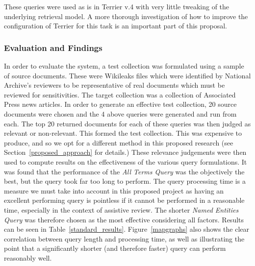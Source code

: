 \documentclass{mprop}
\begin{document}
These queries were used as is in Terrier v.4 with very little tweaking of the underlying retrieval model. A more thorough investigation of how to improve the configuration of Terrier for this task is an important part of this proposal.

\subsubsection{Evaluation and Findings}
In order to evaluate the system, a test collection was formulated using a sample of source documents. 
These were Wikileaks files which were identified by National Archive's reviewers to be representative of real documents which must be reviewed for sensitivities.
The target collection was a collection of Associated Press news articles.
In order to generate an effective test collection, 20 source documents were chosen and the 4 above queries were generated and run from each. 
The top 20 returned documents for each of these queries was then judged as relevant or non-relevant. 
This formed the test collection.
This was expensive to produce, and so we opt for a different method in this proposed research (see Section~\ref{proposed_approach} for details.)
These relevance judgements were then used to compute results on the effectiveness of the various query formulations.
It was found that the performance of the \textit{All Terms Query} was the objectively the best, but the query took far too long to perform. 
The query processing time is a measure we must take into account in this proposed project as having an excellent performing query is pointless if it cannot be performed in a reasonable time, especially in the context of assistive review. The shorter \textit{Named Entities Query } was therefore chosen as the most effective considering all factors. Results can be seen in Table~\ref{standard_results}. Figure~\ref{mapgraphs} also shows the clear correlation between query length and processing time, as well as illustrating the point that a significantly shorter (and therefore faster) query can perform reasonably well.
\end{document}
